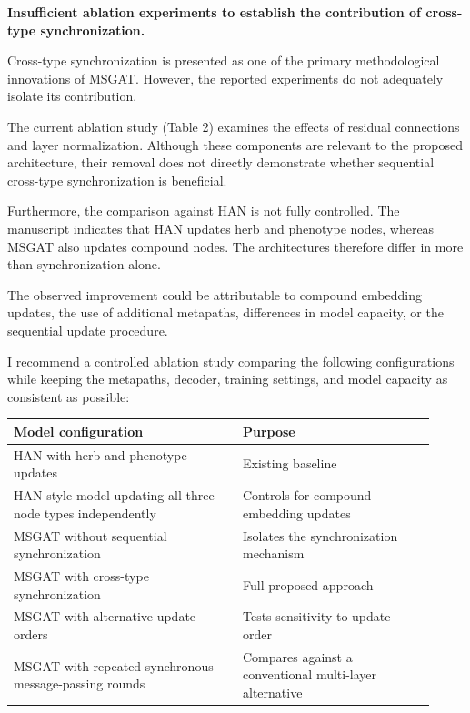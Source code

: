 \documentclass[11pt,american]{article}
\begin{document}
\begin{revcomment}
\textbf{Insufficient ablation experiments to establish the contribution of cross-type synchronization.}

Cross-type synchronization is presented as one of the primary methodological innovations of MSGAT. However, the reported experiments do not adequately isolate its contribution.

The current ablation study (Table 2) examines the effects of residual connections and layer normalization. Although these components are relevant to the proposed architecture, their removal does not directly demonstrate whether sequential cross-type synchronization is beneficial.

Furthermore, the comparison against HAN is not fully controlled. The manuscript indicates that HAN updates herb and phenotype nodes, whereas MSGAT also updates compound nodes. The architectures therefore differ in more than synchronization alone.

The observed improvement could be attributable to compound embedding updates, the use of additional metapaths, differences in model capacity, or the sequential update procedure.

I recommend a controlled ablation study comparing the following configurations while keeping the metapaths, decoder, training settings, and model capacity as consistent as possible:

\vspace{1mm}
\begin{tabular}{@{}p{0.5\linewidth}p{0.42\linewidth}@{}}
\toprule
Model configuration & Purpose \\
\midrule
HAN with herb and phenotype updates & Existing baseline \\
HAN-style model updating all three node types independently & Controls for compound embedding updates \\
MSGAT without sequential synchronization & Isolates the synchronization mechanism \\
MSGAT with cross-type synchronization & Full proposed approach \\
MSGAT with alternative update orders & Tests sensitivity to update order \\
MSGAT with repeated synchronous message-passing rounds & Compares against a conventional multi-layer alternative \\
\bottomrule
\end{tabular}
\vspace{1mm}


\end{revcomment}
\end{document}
